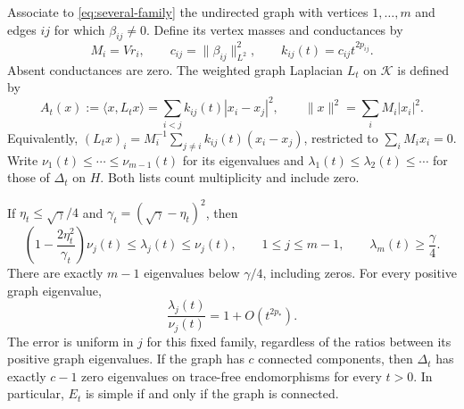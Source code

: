 Associate to \eqref{eq:several-family} the undirected graph with vertices
$1,\ldots,m$ and edges $ij$ for which $\beta_{ij}\ne0$. Define its vertex
masses and conductances by
\begin{equation}\label{eq:graph-data}
 M_i=Vr_i,\qquad c_{ij}=\lVert\beta_{ij}\rVert_{L^2}^2,
 \qquad k_{ij}(t)=c_{ij}t^{2p_{ij}}.
\end{equation}
Absent conductances are zero. The weighted graph Laplacian $L_t$ on
$\mathcal K$ is defined by
\begin{equation}\label{eq:graph-form}
 A_t(x):=\langle x,L_tx\rangle
 =\sum_{i<j}k_{ij}(t)|x_i-x_j|^2,
 \qquad \lVert x\rVert^2=\sum_iM_i|x_i|^2.
\end{equation}
Equivalently, $(L_tx)_i=M_i^{-1}\sum_{j\ne i}k_{ij}(t)(x_i-x_j)$,
restricted to $\sum_iM_ix_i=0$. Write
$\nu_1(t)\le\cdots\le\nu_{m-1}(t)$ for its eigenvalues and
$\lambda_1(t)\le\lambda_2(t)\le\cdots$ for those of $\Delta_t$ on $H$.
Both lists count multiplicity and include zero.

\begin{theorem}\label{thm:relative}
If $\eta_t\le\sqrt\gamma/4$ and $\gamma_t=(\sqrt\gamma-\eta_t)^2$,
then
\begin{equation}\label{eq:relative}
 \left(1-\frac{2\eta_t^2}{\gamma_t}\right)\nu_j(t)
 \le\lambda_j(t)\le\nu_j(t),\qquad 1\le j\le m-1,
 \qquad \lambda_m(t)\ge\frac\gamma4.
\end{equation}
There are exactly $m-1$ eigenvalues below $\gamma/4$, including zeros.
For every positive graph eigenvalue,
\begin{equation}\label{eq:relative-ratio}
 \frac{\lambda_j(t)}{\nu_j(t)}=1+O(t^{2p_*}).
\end{equation}
The error is uniform in $j$ for this fixed family, regardless of the
ratios between its positive graph eigenvalues. If the graph has $c$
connected components, then $\Delta_t$ has exactly $c-1$ zero eigenvalues
on trace-free endomorphisms for every $t>0$. In particular, $E_t$ is
simple if and only if the graph is connected.
\end{theorem}

